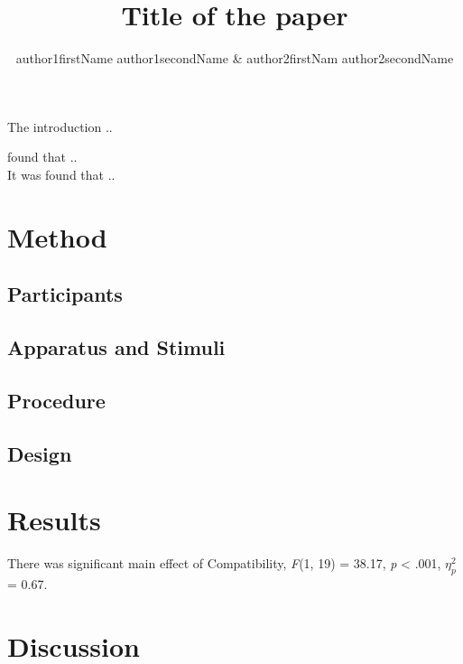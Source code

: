 \documentclass[man, 12pt]{apa6}\usepackage[]{graphicx}\usepackage[]{color}
\title{Title of the paper}
\author{author1firstName author1secondName \& author2firstNam
author2secondName}
\affiliation{Department of Psychology, University of XXX}
\begin{document}
\maketitle
The introduction .. \textcite{botvinick2001conflict}

\textcite{botvinick2001conflict} found that .. \\
It was found that .. \parencite[][]{simon1969reactions, eriksen1974effects, stroop1935studies}

\section{Method}
\subsection{Participants}
\subsection{Apparatus and Stimuli}
\subsection{Procedure}

\subsection{Design}

\section{Results}





There was significant main effect of Compatibility, \emph{F}(1, 19) = 38.17, \emph{p} < .001, $\eta_{p}^2$ = 0.67.

\section{Discussion}

\printbibliography
\end{document}
